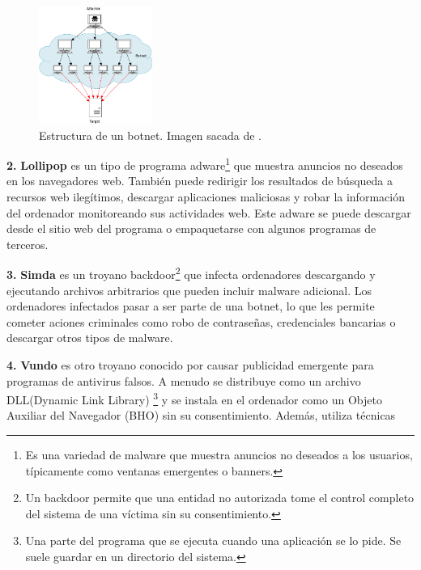 \begin{figure}
  \begin{center}
    \includegraphics[width=0.33\textwidth]{img/botnetStructure.png}
  \end{center}
    \caption{Estructura de un botnet. Imagen sacada de \citep{botnetstructure}.}
  \label{fig:botnetstructure}
\end{figure}
\vspace{-\baselineskip}

\bigskip
\textbf{2.} \textbf{Lollipop} es un tipo de programa adware\footnote{Es una variedad de malware que muestra anuncios no deseados a los usuarios, típicamente como ventanas emergentes o banners.} que muestra anuncios no deseados en los navegadores web. También puede redirigir los resultados de búsqueda a recursos web ilegítimos, descargar aplicaciones maliciosas y robar la información del ordenador monitoreando sus actividades web. Este adware se puede descargar desde el sitio web del programa o empaquetarse con algunos programas de terceros.


\textbf{3.} \textbf{Simda} es un troyano backdoor\footnote{Un backdoor permite que una entidad no autorizada tome el control completo del sistema de una víctima sin su consentimiento.} que infecta ordenadores descargando y ejecutando archivos arbitrarios que pueden incluir malware adicional. Los ordenadores infectados pasar a ser parte de una botnet, lo que les permite cometer aciones criminales como robo de contraseñas, credenciales bancarias o descargar otros tipos de malware.

\textbf{4.} \textbf{Vundo} es otro troyano conocido por causar publicidad emergente para programas de antivirus falsos. A menudo se distribuye como un archivo DLL(Dynamic Link Library) \footnote{Una parte del programa que se ejecuta cuando una aplicación se lo pide. Se suele guardar en un directorio del sistema.} y se instala en el ordenador como un Objeto Auxiliar del Navegador (BHO) sin su consentimiento. Además, utiliza técnicas

